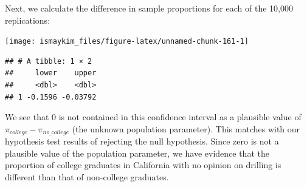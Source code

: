 \documentclass[]{tufte-book}
\newenvironment{Shaded}{\begin{snugshade}}{\end{snugshade}}
\newcommand{\KeywordTok}[1]{\textcolor[rgb]{0.13,0.29,0.53}{\textbf{{#1}}}}
\newcommand{\DataTypeTok}[1]{\textcolor[rgb]{0.13,0.29,0.53}{{#1}}}
\newcommand{\DecValTok}[1]{\textcolor[rgb]{0.00,0.00,0.81}{{#1}}}
\newcommand{\FloatTok}[1]{\textcolor[rgb]{0.00,0.00,0.81}{{#1}}}
\newcommand{\StringTok}[1]{\textcolor[rgb]{0.31,0.60,0.02}{{#1}}}
\newcommand{\NormalTok}[1]{{#1}}
\begin{document}
Next, we calculate the difference in sample proportions for each of the
10,000 replications:

\begin{Shaded}
\end{Shaded}

\begin{Shaded}
\end{Shaded}

\begin{center}\texttt{[image: ismaykim\_files/figure-latex/unnamed-chunk-161-1]} \end{center}

\begin{Shaded}
\end{Shaded}

\begin{verbatim}
## # A tibble: 1 × 2
##     lower    upper
##     <dbl>    <dbl>
## 1 -0.1596 -0.03792
\end{verbatim}

We see that 0 is not contained in this confidence interval as a
plausible value of \(\pi_{college} - \pi_{no\_college}\) (the unknown
population parameter). This matches with our hypothesis test results of
rejecting the null hypothesis. Since zero is not a plausible value of
the population parameter, we have evidence that the proportion of
college graduates in California with no opinion on drilling is different
than that of non-college graduates.
\end{document}
